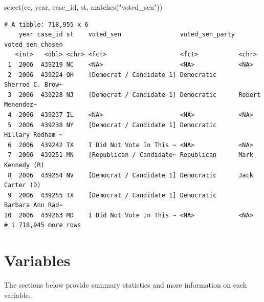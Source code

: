 \documentclass[10pt,article,oneside]{memoir}
\newenvironment{Shaded}{\begin{snugshade}}{\end{snugshade}}
\newcommand{\FunctionTok}[1]{\textcolor[rgb]{0.28,0.35,0.67}{#1}}
\newcommand{\NormalTok}[1]{\textcolor[rgb]{0.00,0.23,0.31}{#1}}
\newcommand{\StringTok}[1]{\textcolor[rgb]{0.13,0.47,0.30}{#1}}
\begin{document}
\begin{Shaded}
\begin{Highlighting}[]
\FunctionTok{select}\NormalTok{(cc, year, case\_id, st, }\FunctionTok{matches}\NormalTok{(}\StringTok{"voted\_sen"}\NormalTok{))}
\end{Highlighting}
\end{Shaded}

\begin{verbatim}
# A tibble: 718,955 x 6
    year case_id st    voted_sen                voted_sen_party voted_sen_chosen
   <int>   <dbl> <chr> <fct>                    <fct>           <chr>           
 1  2006  439219 NC    <NA>                     <NA>            <NA>            
 2  2006  439224 OH    [Democrat / Candidate 1] Democratic      Sherrod C. Brow~
 3  2006  439228 NJ    [Democrat / Candidate 1] Democratic      Robert Menendez~
 4  2006  439237 IL    <NA>                     <NA>            <NA>            
 5  2006  439238 NY    [Democrat / Candidate 1] Democratic      Hillary Rodham ~
 6  2006  439242 TX    I Did Not Vote In This ~ <NA>            <NA>            
 7  2006  439251 MN    [Republican / Candidate~ Republican      Mark Kennedy (R)
 8  2006  439254 NV    [Democrat / Candidate 1] Democratic      Jack Carter (D) 
 9  2006  439255 TX    [Democrat / Candidate 1] Democratic      Barbara Ann Rad~
10  2006  439263 MD    I Did Not Vote In This ~ <NA>            <NA>            
# i 718,945 more rows
\end{verbatim}

\section{Variables}\label{variables}

The sections below provide summary statistics and more information on
each variable.
\end{document}
